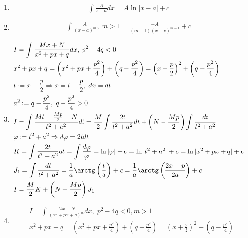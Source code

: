 \documentclass{article}
\begin{document}
\begin{enumerate}
	\item{}
	\begin{align*}
		\int \frac{A}{x-a}dx=A\ln|x-a|+c
	\end{align*}
	\item{}
	\begin{align*}
		\int \frac{A}{(x-a)^{m}},\;m>1=\frac{-A}{(m-1)(x-a)^{m-1}}+c
	\end{align*}
	\item{}
	\begin{align*}
		 & I=\int \frac{Mx+N}{x^{2}+px+q}dx,\;p^{2}-4q<0                                                                                                   \\
		 & x^{2}+px+q=\left(x^{2}+px+\frac{p^{2}}{4}\right)+\left(q-\frac{p^{2}}{4}\right)=\left(x+\frac{p}{2}\right)^{2}+\left(q-\frac{p^{2}}{4}\right)   \\
		 & t:=x+\frac{p}{2}\Rarr x=t-\frac{p}{2},\;dx=dt                                                                                                   \\
		 & a^{2}:=q-\frac{p^{2}}{4},\;q-\frac{p^{2}}{4}>0                                                                                                  \\
		 & I=\int \frac{Mt - \frac{Mp}{2}+N}{t^{2}+a^{2}}dt=\frac{M}{2}\int \frac{2t}{t^{2}+a^{2}}dt+\left(N-\frac{Mp}{2}\right)\int\frac{dt}{t^{2}+a^{2}} \\
		 & \varphi:=t^{2}+a^{2}\Rarr d\varphi=2tdt                                                                                                         \\
		 & K=\int \frac{2t}{t^{2}+a^{2}}dt=\int\frac{d\varphi}{\varphi}=\ln|\varphi|+c=\ln|t^{2}+a^{2}|+c=\ln|x^{2}+px+q|+c                                \\
		 & J_1=\int\frac{dt}{t^{2}+a^{2}}=\frac{1}{a}\arctg\left(\frac{t}{a}\right)+c=\frac{1}{a}\arctg\left(\frac{2x+p}{2a}\right)+c                      \\
		 & I=\frac{M}{2}K+\left(N-\frac{Mp}{2}\right)J_1
	\end{align*}
	\item{}
	\begin{align*}
		 & I=\int \frac{Mx+N}{(x^{2}+px+q)^{m}}dx,\;p^{2}-4q<0,m>1                                                                                                           \\
		 & x^{2}+px+q=\left(x^{2}+px+\frac{p^{2}}{4}\right)+\left(q-\frac{p^{2}}{4}\right)=\left(x+\frac{p}{2}\right)^{2}+\left(q-\frac{p^{2}}{4}\right)                     \\

\end{align*}
\end{enumerate}
\end{document}

